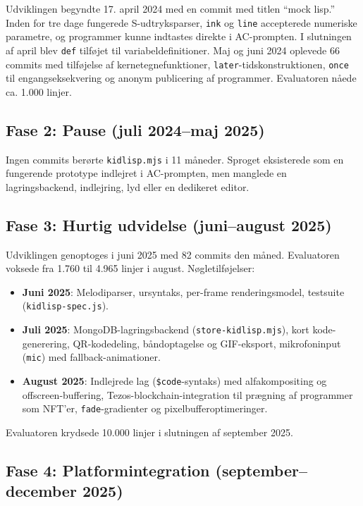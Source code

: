 \documentclass[10pt,letterpaper,twocolumn]{article}
\begin{document}
Udviklingen begyndte 17. april 2024 med en commit med titlen ``mock lisp.'' Inden for tre dage fungerede S-udtryksparser, \texttt{ink} og \texttt{line} accepterede numeriske parametre, og programmer kunne indtastes direkte i AC-prompten. I slutningen af april blev \texttt{def} tilføjet til variabeldefinitioner. Maj og juni 2024 oplevede 66 commits med tilføjelse af kernetegnefunktioner, \texttt{later}-tidskonstruktionen, \texttt{once} til engangseksekvering og anonym publicering af programmer. Evaluatoren nåede ca. 1.000 linjer.

\subsection{Fase 2: Pause (juli 2024--maj 2025)}

Ingen commits berørte \texttt{kidlisp.mjs} i 11 måneder. Sproget eksisterede som en fungerende prototype indlejret i AC-prompten, men manglede en lagringsbackend, indlejring, lyd eller en dedikeret editor.

\subsection{Fase 3: Hurtig udvidelse (juni--august 2025)}

Udviklingen genoptoges i juni 2025 med 82 commits den måned. Evaluatoren voksede fra 1.760 til 4.965 linjer i august. Nøgletilføjelser:

\begin{itemize}
  \item \textbf{Juni 2025}: Melodiparser, ursyntaks, per-frame renderingsmodel, testsuite (\texttt{kidlisp-spec.js}).
  \item \textbf{Juli 2025}: MongoDB-lagringsbackend (\texttt{store-kidlisp.mjs}), kort kode-generering, QR-kodedeling, båndoptagelse og GIF-eksport, mikrofoninput (\texttt{mic}) med fallback-animationer.
  \item \textbf{August 2025}: Indlejrede lag (\texttt{\$code}-syntaks) med alfakompositing og offscreen-buffering, Tezos-blockchain-integration til prægning af programmer som NFT'er, \texttt{fade}-gradienter og pixelbufferoptimeringer.
\end{itemize}

Evaluatoren krydsede 10.000 linjer i slutningen af september 2025.

\subsection{Fase 4: Platformintegration (september--december 2025)}
\end{document}
